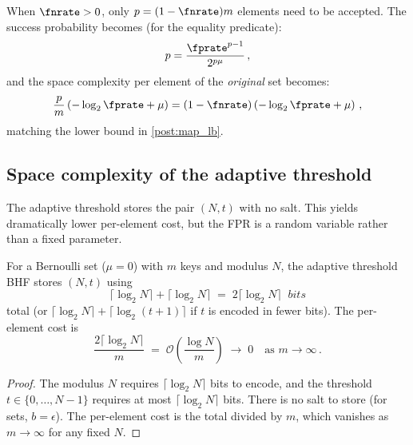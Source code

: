 When $\fnrate > 0$, only $p = (1-\fnrate)m$ elements need to be accepted.
The success probability becomes (for the equality predicate):
\begin{equation}
    p = \frac{\fprate^{p-1}}{2^{p\mu}}\,,
\end{equation}
and the space complexity per element of the \emph{original} set becomes:
\begin{equation}
    \frac{p}{m}\left(-\log_2 \fprate + \mu\right)
    = (1 - \fnrate)\left(-\log_2 \fprate + \mu\right)\,,
\end{equation}
matching the lower bound in \cref{post:map_lb}.

\subsection{Space complexity of the adaptive threshold}
\label{sec:adaptive_space}

The adaptive threshold stores the pair $(N, t)$ with no salt.
This yields dramatically lower per-element cost, but the FPR is a random
variable rather than a fixed parameter.

\begin{theorem}
\label{thm:adaptive_space}
For a Bernoulli set ($\mu = 0$) with $m$ keys and modulus $N$, the adaptive
threshold BHF stores $(N, t)$ using
\begin{equation}
\label{eq:adaptive_bits}
    \lceil \log_2 N \rceil + \lceil \log_2 N \rceil
    \;=\; 2\lceil \log_2 N \rceil \;\;\si{bits}
\end{equation}
total (or $\lceil \log_2 N \rceil + \lceil \log_2(t+1) \rceil$ if $t$ is
encoded in fewer bits).
The per-element cost is
\begin{equation}
\label{eq:adaptive_per_element}
    \frac{2\lceil \log_2 N \rceil}{m} \;=\; \mathcal{O}\!\left(\frac{\log N}{m}\right) \;\to\; 0
    \quad\text{as } m \to \infty\,.
\end{equation}
\end{theorem}
\begin{proof}
The modulus $N$ requires $\lceil \log_2 N \rceil$ bits to encode, and the
threshold $t \in \{0,\ldots,N-1\}$ requires at most $\lceil \log_2 N \rceil$
bits.
There is no salt to store (for sets, $b = \epsilon$).
The per-element cost is the total divided by $m$, which vanishes as
$m \to \infty$ for any fixed $N$.
\end{proof}

